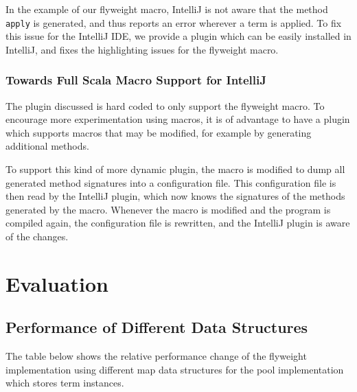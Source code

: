 \documentclass[11pt]{article}
\begin{document}
    In the example of our flyweight macro, IntelliJ is not aware that
    the method \texttt{apply} is generated, and thus reports an error
    wherever a term is applied. To fix this issue for the IntelliJ IDE,
    we provide a plugin which
    can be easily installed in IntelliJ, and fixes the highlighting
    issues for the flyweight macro.

    \subsubsection{Towards Full Scala Macro Support for IntelliJ} \label{full-scala-macro-support}

    The plugin discussed is hard coded to only support the flyweight macro.
    To encourage more experimentation using macros, it is of advantage
    to have a plugin which supports macros that may be modified, for example
    by generating additional methods.

    To support this kind of more dynamic plugin, the macro is modified to
    dump all generated method signatures into a configuration file.
    This configuration file is then read by the IntelliJ plugin,
    which now knows the signatures of the methods generated by the macro.
    Whenever the macro is modified and the program is compiled again,
    the configuration file is rewritten, and the IntelliJ plugin is
    aware of the changes.

    \newpage
    \section{Evaluation}


    \subsection{Performance of Different Data Structures}
    

    The table below shows the relative performance change of the flyweight implementation
    using different map data structures for the pool implementation which stores
    term instances.
\end{document}
